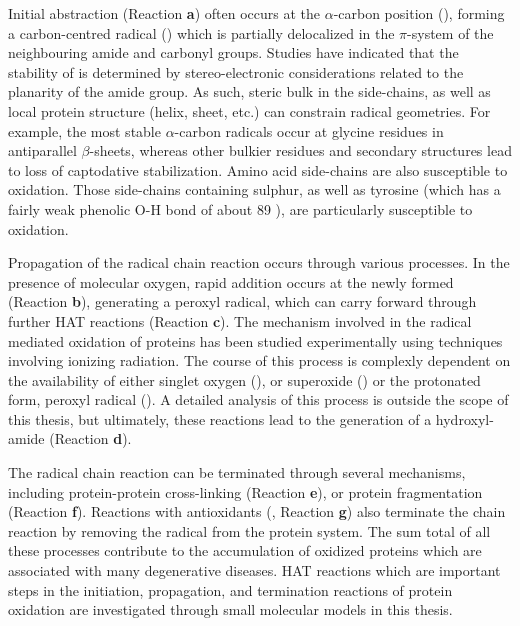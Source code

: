 Initial abstraction (Reaction \textbf{a}) often occurs at the $\alpha$-carbon
position (), forming a carbon-centred radical
() which is partially delocalized in the $\pi$-system of the
neighbouring amide and carbonyl groups. Studies have indicated that the
stability of  is determined by stereo-electronic
considerations related to the planarity of the amide group.\cite{Salamone2014b}
As such, steric bulk in the side-chains, as well as local protein structure
(helix, sheet, etc.) can constrain radical geometries. For example, the most
stable $\alpha$-carbon radicals occur at glycine residues in antiparallel
$\beta$-sheets, whereas other bulkier residues and secondary structures lead to
loss of captodative stabilization.\cite{Rauk2000} Amino acid side-chains are
also susceptible to oxidation. Those side-chains containing
sulphur,\cite{Stadtman2004} as well as tyrosine (which has a fairly weak
phenolic O-H bond of about 89 \kcalmol),\cite{Mulder2005} are particularly
susceptible to oxidation.

Propagation of the radical chain reaction occurs through various processes. In
the presence of molecular oxygen, rapid addition occurs at the newly formed
 (Reaction \textbf{b}), generating a peroxyl radical, which
can carry forward through further HAT reactions (Reaction
\textbf{c}).\cite{Stadtman2003} The mechanism involved in the radical mediated
oxidation of proteins has been studied experimentally using techniques
involving ionizing radiation.\cite{Garrison1962,Garrison1987} The course of
this process is complexly dependent on the availability of either singlet
oxygen (), or superoxide () or the protonated form,
peroxyl radical (). A detailed analysis of this process is outside
the scope of this thesis, but ultimately, these reactions lead to the
generation of a hydroxyl-amide (Reaction \textbf{d}).

The radical chain reaction can be terminated through several mechanisms,
including protein-protein cross-linking (Reaction \textbf{e}), or protein
fragmentation (Reaction \textbf{f}). Reactions with antioxidants (,
Reaction \textbf{g}) also terminate the chain reaction by removing the radical
from the protein system. The sum total of all these processes contribute to the
accumulation of oxidized proteins which are associated with many degenerative
diseases.\cite{Halliwell2006} HAT reactions which are important steps in the
initiation, propagation, and termination reactions of protein oxidation are
investigated through small molecular models in this thesis.

